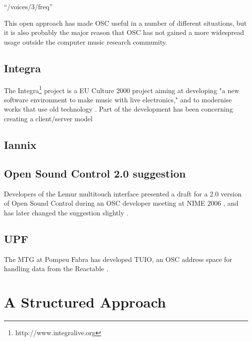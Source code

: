 \documentclass{sig-alternate}
\begin{document}
“/voices/3/freq” 

This open approach has made OSC useful in a number of different situations, but it is also probably the major reason that OSC has not gained a more widespread usage outside the computer music research community. 




\subsection{Integra}

The Integra\footnote{http://www.integralive.org} project is a EU Culture 2000 project aiming at developing "a new software environment to make music with live electronics," and to modernise works that use old technology \cite{Bullock:2007}. Part of the development has been concerning creating a client/server model 


\subsection{Iannix}





\subsection{Open Sound Control 2.0 suggestion}

Developers of the Lemur multitouch interface presented a draft for a 2.0 version of Open Sound Control during an OSC developer meeting at NIME 2006 \cite{Jazzmutant:2006}, and has later changed the suggestion slightly \cite{Jazzmutant:2007}.


\subsection{UPF}

The MTG at Pompeu Fabra has developed TUIO, an OSC address space for handling data from the Reactable \cite{Kaltenbrunner:2005}.


\section{A Structured Approach}



\end{document}
